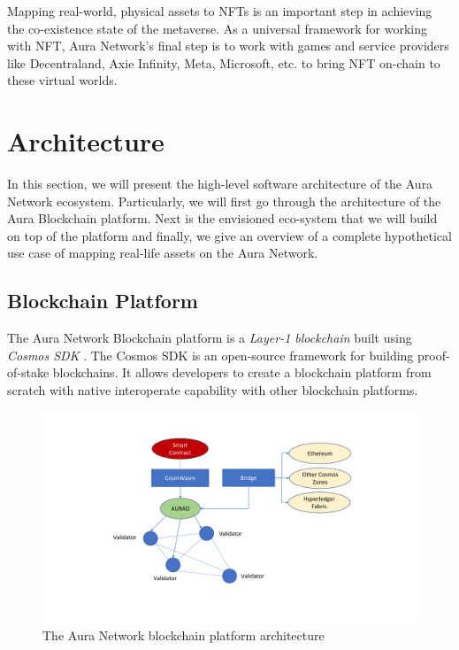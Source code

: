 \documentclass[12pt]{article}
\begin{document}
Mapping real-world, physical assets to NFTs is an important step in achieving the co-existence state of the metaverse. As a universal framework for working with NFT, Aura Network's final step is to work with games and service providers like Decentraland, Axie Infinity, Meta, Microsoft, etc. to bring NFT on-chain to these virtual worlds.

\section{Architecture}
In this section, we will present the high-level software architecture of the Aura Network ecosystem. Particularly, we will first go through the architecture of the Aura Blockchain platform. Next is the envisioned eco-system that we will build on top of the platform and finally, we give an overview of a complete hypothetical use case of mapping real-life assets on the Aura Network.

\subsection{Blockchain Platform}
The Aura Network Blockchain platform is a \emph{Layer-1 blockchain} built using \emph{Cosmos SDK} \cite{kwon2019cosmos}. The Cosmos SDK is an open-source framework for building proof-of-stake blockchains. It allows developers to create a blockchain platform from scratch with native interoperate capability with other blockchain platforms. 

\begin{figure}[ht]
\label{fig:architecture}
\includegraphics[width=\textwidth, trim={5cm 2cm 5cm 0}, clip]{img/architecture.pdf}
\centering
\caption{The Aura Network blockchain platform architecture}
\end{figure}
\end{document}
